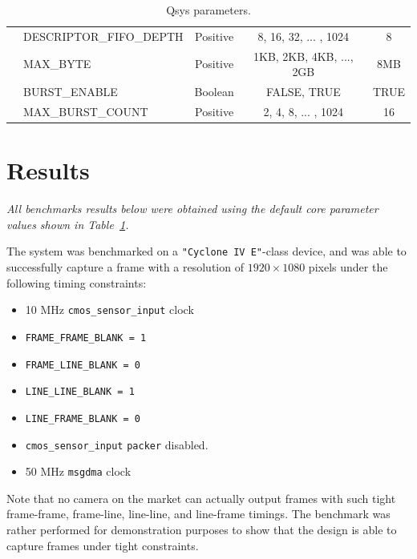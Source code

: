 \documentclass{article}
\def \cmossensorinput {\texttt{cmos\_sensor\_input} }
\def \msgdma {\texttt{msgdma} }
\begin{document}
\begin{table}[h]
{{\begin{tabular}{clccc}
                                                  & DESCRIPTOR\_FIFO\_DEPTH & Positive & 8, 16, 32, ... , 1024       & 8             \\
                                                  & MAX\_BYTE               & Positive & 1KB, 2KB, 4KB, ..., 2GB     & 8MB           \\
                                                  & BURST\_ENABLE           & Boolean  & FALSE, TRUE                 & TRUE          \\
                                                  & MAX\_BURST\_COUNT       & Positive & 2, 4, 8, ... , 1024         & 16            \\
                \bottomrule
            \end{tabular}
        }
    }
    \caption{Qsys parameters.}
    \label{tab:core_parameters}
\end{table}

\section{Results}
\emph{All benchmarks results below were obtained using the default core parameter values shown in Table~\ref{tab:core_parameters}.}

The system was benchmarked on a \texttt{"Cyclone IV E"}-class device, and was able to successfully capture a frame with a resolution of $1920 \times 1080$ pixels under the following timing constraints:

\begin{itemize}
    \itemsep-0.5em
    \item 10 MHz \cmossensorinput clock
    \item \texttt{FRAME\_FRAME\_BLANK = 1}
    \item \texttt{FRAME\_LINE\_BLANK = 0}
    \item \texttt{LINE\_LINE\_BLANK = 1}
    \item \texttt{LINE\_FRAME\_BLANK = 0}
    \item \cmossensorinput \texttt{packer} disabled.
    \item 50 MHz \msgdma clock
\end{itemize}

Note that no camera on the market can actually output frames with such tight frame-frame, frame-line, line-line, and line-frame timings.
The benchmark was rather performed for demonstration purposes to show that the design is able to capture frames under tight constraints.
\end{document}
